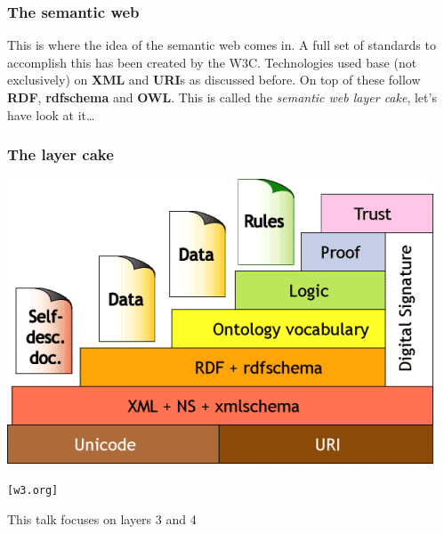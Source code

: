 \documentclass{beamer}
\begin{document}
        \begin{frame}
            \frametitle{The semantic web}

            This is where the idea of the semantic web comes in.
            \vskip 0.3cm
            A full set of standards to accomplish this has been created by the W3C.
            \vskip 0.3cm
            Technologies used base (not exclusively) on \textbf{XML} and \textbf{URI}s as discussed before.
            \vskip 0.3cm
            On top of these follow \textbf{RDF}, \textbf{rdfschema} and \textbf{OWL}.
            \vskip 0.3cm
            This is called the \textit{semantic web layer cake}, let's have look at it\ldots
        \end{frame}

        \begin{frame}
            \frametitle{The layer cake}

            \begin{center}
                \includegraphics[scale=0.5]{layercake}
            \end{center}
            \begin{flushright}
                \texttt{[w3.org]}
            \end{flushright}
            This talk focuses on layers 3 and 4 
        \end{frame}
\end{document}
